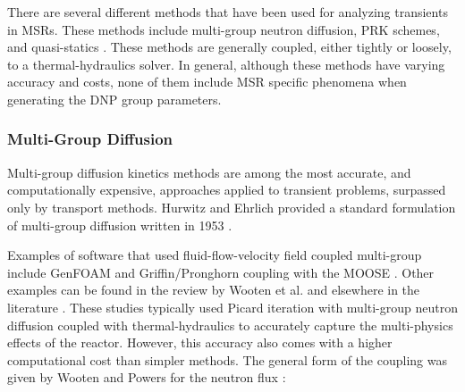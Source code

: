 There are several different methods that have been used for analyzing transients in \glspl{MSR}.
These methods include multi-group neutron diffusion, \gls{PRK} schemes, and quasi-statics \cite{wooten2018review}.
These methods are generally coupled, either tightly or loosely, to a thermal-hydraulics solver.
In general, although these methods have varying accuracy and costs, none of them include \gls{MSR} specific phenomena when generating the \gls{DNP} group parameters.

\subsubsection{Multi-Group Diffusion}
\label{sec:mgd-kinetics}

Multi-group diffusion kinetics methods are among the most accurate, and computationally expensive, approaches applied to transient problems, surpassed only by transport methods.
Hurwitz and Ehrlich provided a standard formulation of multi-group diffusion written in 1953  \cite{hurwitz1953multigroup}.

Examples of software that used fluid-flow-velocity field coupled multi-group include GenFOAM and Griffin/Pronghorn coupling with the \gls{MOOSE} \cite{fiorina2015gen, tano2023coupled}.
Other examples can be found in the review by Wooten et al. \cite{kvrepel2007dyn3d, fiorina2014modelling, kophazi2009development} and elsewhere in the literature \cite{zhang2009analysis, yamamoto2006transient, nicolino2008coupled, park_advancements_2025}.
These studies typically used Picard iteration with multi-group neutron diffusion coupled with thermal-hydraulics to accurately capture the multi-physics effects of the reactor.
However, this accuracy also comes with a higher computational cost than simpler methods.
The general form of the coupling was given by Wooten and Powers for the neutron flux \cite{wooten2018review}:

